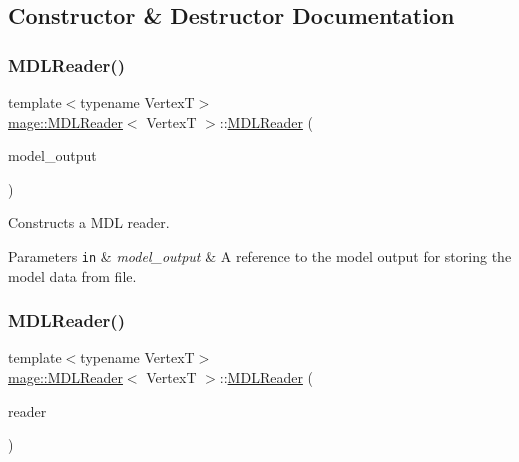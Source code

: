 \subsection{Constructor \& Destructor Documentation}
\hypertarget{classmage_1_1_m_d_l_reader_a068ed8c9101b42033ea166ab7aa03c04}{}\label{classmage_1_1_m_d_l_reader_a068ed8c9101b42033ea166ab7aa03c04} 
\subsubsection{\texorpdfstring{M\+D\+L\+Reader()}{MDLReader()}\hspace{0.1cm}{\footnotesize\ttfamily [1/3]}}
{\footnotesize\ttfamily template$<$typename VertexT$>$ \\
\hyperlink{classmage_1_1_m_d_l_reader}{mage\+::\+M\+D\+L\+Reader}$<$ VertexT $>$\+::\hyperlink{classmage_1_1_m_d_l_reader}{M\+D\+L\+Reader} (\begin{DoxyParamCaption}\item[{\hyperlink{structmage_1_1_model_output}{Model\+Output}$<$ VertexT $>$ \&}]{model\+\_\+output }\end{DoxyParamCaption})\hspace{0.3cm}{\ttfamily [explicit]}}

Constructs a M\+DL reader.


\begin{DoxyParams}[1]{Parameters}
\mbox{\tt in}  & {\em model\+\_\+output} & A reference to the model output for storing the model data from file. \\
\hline
\end{DoxyParams}
\hypertarget{classmage_1_1_m_d_l_reader_aaabae8c4e8632423f1af18a6d99345db}{}\label{classmage_1_1_m_d_l_reader_aaabae8c4e8632423f1af18a6d99345db} 
\subsubsection{\texorpdfstring{M\+D\+L\+Reader()}{MDLReader()}\hspace{0.1cm}{\footnotesize\ttfamily [2/3]}}
{\footnotesize\ttfamily template$<$typename VertexT$>$ \\
\hyperlink{classmage_1_1_m_d_l_reader}{mage\+::\+M\+D\+L\+Reader}$<$ VertexT $>$\+::\hyperlink{classmage_1_1_m_d_l_reader}{M\+D\+L\+Reader} (\begin{DoxyParamCaption}\item[{const \hyperlink{classmage_1_1_m_d_l_reader}{M\+D\+L\+Reader}$<$ VertexT $>$ \&}]{reader }\end{DoxyParamCaption})\hspace{0.3cm}{\ttfamily [delete]}}

